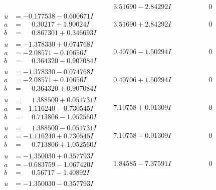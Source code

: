 \documentclass[1p]{elsarticle_modified}
\theoremstyle{definition}
\begin{document}
$$\begin{array}{c|c|c}
 & \phantom{-}3.51690 - 2.84292 I & \phantom{-0.000000 } 0 \\ \hline\begin{aligned}
u &= -0.177538 - 0.600671 I \\
a &= \phantom{-}0.30217 + 1.90024 I \\
b &= \phantom{-}0.867301 + 0.346693 I\end{aligned}
 & \phantom{-}3.51690 + 2.84292 I & \phantom{-0.000000 } 0 \\ \hline\begin{aligned}
u &= -1.378330 + 0.074768 I \\
a &= -2.08571 - 0.10656 I \\
b &= \phantom{-}0.364320 - 0.907084 I\end{aligned}
 & \phantom{-}0.40706 - 1.50294 I & \phantom{-0.000000 } 0 \\ \hline\begin{aligned}
u &= -1.378330 - 0.074768 I \\
a &= -2.08571 + 0.10656 I \\
b &= \phantom{-}0.364320 + 0.907084 I\end{aligned}
 & \phantom{-}0.40706 + 1.50294 I & \phantom{-0.000000 } 0 \\ \hline\begin{aligned}
u &= \phantom{-}1.388500 + 0.051731 I \\
a &= -1.116240 - 0.730545 I \\
b &= \phantom{-}0.713806 - 1.052560 I\end{aligned}
 & \phantom{-}7.10758 + 0.01309 I & \phantom{-0.000000 } 0 \\ \hline\begin{aligned}
u &= \phantom{-}1.388500 - 0.051731 I \\
a &= -1.116240 + 0.730545 I \\
b &= \phantom{-}0.713806 + 1.052560 I\end{aligned}
 & \phantom{-}7.10758 - 0.01309 I & \phantom{-0.000000 } 0 \\ \hline\begin{aligned}
u &= -1.350030 + 0.357793 I \\
a &= -0.683759 - 1.067420 I \\
b &= \phantom{-}0.56717 - 1.40892 I\end{aligned}
 & \phantom{-}1.84585 - 7.37591 I & \phantom{-0.000000 } 0 \\ \hline\begin{aligned}
u &= -1.350030 - 0.357793 I \\

\end{aligned}
\end{array}$$
\end{document}
